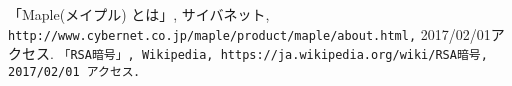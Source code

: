 \begin{thebibliography}{99}
  「Maple(メイプル) とは」, サイバネット, \verb|http://www.cybernet.co.jp/maple/product/maple/about.html,| 2017/02/01アクセス.
  \verb|「RSA暗号」, Wikipedia, https://ja.wikipedia.org/wiki/RSA暗号, 2017/02/01 アクセス．|\end{thebibliography}

